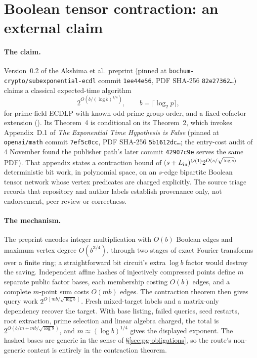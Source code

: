 \section{Boolean tensor contraction: an external claim}\label{sec:pt-tensor}

\paragraph{The claim.} Version~0.2 of the Akshima et al.\ preprint (pinned
at \texttt{bochum-crypto/subexponential-ecdl} commit \texttt{1ee44e56},
PDF SHA-256 \texttt{82e27362\ldots}) claims a classical expected-time
algorithm
\[
  2^{O(b/(\log b)^{1/4})},\qquad b=\lceil\log_2p\rceil,
\]
for prime-field ECDLP with known odd prime group order, and a fixed-cofactor
extension ().
Its Theorem~4 is conditional on its Theorem~2, which invokes Appendix~D.1
of \emph{The Exponential Time Hypothesis is False} (pinned at
\texttt{openai/math} commit \texttt{7ef5c0cc}, PDF SHA-256
\texttt{5b1612dc\ldots}; the entry-cost audit of 4 November found the
publisher path's later commit \texttt{42907c9e} serves the same PDF). That
appendix states a contraction bound of
$(s+L_{\rm in})^{O(1)}2^{O(s/\sqrt{\log s})}$ deterministic bit work, in
polynomial space, on an $s$-edge bipartite Boolean tensor network whose
vertex predicates are charged explicitly. The source triage records that
repository and author labels establish provenance only, not endorsement,
peer review or correctness.

\paragraph{The mechanism.} The preprint encodes integer multiplication with
$O(b)$ Boolean edges and maximum vertex degree $O(b^{3/4})$, through two
stages of exact Fourier transforms over a finite ring; a straightforward bit
circuit's extra $\log b$ factor would destroy the saving. Independent affine
hashes of injectively compressed points define $m$ separate public factor
bases, each membership costing $O(b)$ edges, and a complete $m$-point sum
costs $O(mb)$ edges. The contraction theorem then gives query work
$2^{O(mb/\sqrt{\log b})}$. Fresh mixed-target labels and a matrix-only
dependency recover the target. With base listing, failed queries, seed
restarts, root extraction, prime selection and linear algebra charged, the
total is $2^{O(b/m+mb/\sqrt{\log b})}$, and $m\approx(\log b)^{1/4}$ gives
the displayed exponent. The hashed bases are generic in the sense of
\S\ref{sec:pg-obligations}, so the route's non-generic content is entirely
in the contraction theorem.


